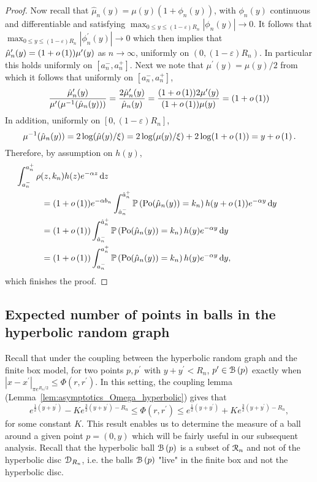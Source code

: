 \begin{proof}
Now recall that $\hat{\mu}_n(y) = \mu(y)(1 + \phi_n(y))$, with $\phi_n(y)$ continuous and differentiable and satisfying
$\max_{0 \le y \le (1 - \varepsilon)R_n} |\phi_n(y)| \to 0$. It follows that $\max_{0 \le y \le (1 - \varepsilon)R_n} |\phi_n^\prime(y)| \to 0$ which then implies that $\hat{\mu}_n^\prime(y) = (1 + o\left(1\right))\mu^\prime(y)$ as $n \to \infty$, uniformly on $(0,(1-\varepsilon)R_n)$. In particular this holds uniformly on $[a_n^-, a_n^+]$. Next we note that $\mu^\prime(y) = \mu(y)/2$ from which it follows that uniformly on $[a_n^-, a_n^+]$,
\[
	\frac{\hat{\mu}_n^\prime(y)}{\mu^\prime(\mu^{-1}(\hat{\mu}_n(y)))}
	= \frac{2\hat{\mu}_n^\prime(y)}{\hat{\mu}_n(y)}
	= \frac{(1 + o\left(1\right))2\mu^\prime(y)}{(1 + o\left(1\right))\mu(y)}
	= (1+o\left(1\right))
\]
In addition, uniformly on $[0,(1-\varepsilon)R_n]$,
\[
	\mu^{-1}(\hat{\mu}_n(y)) = 2 \log(\hat{\mu}(y)/\xi) = 2 \log(\mu(y)/\xi) + 2 \log(1 + o\left(1\right)) = y + o\left(1\right).
\]
Therefore, by assumption on $h(y)$,
\begin{align*}
	&\hspace{-30pt}\int_{a_n^-}^{a_n^+} \rho(z,k_n) h(z) e^{-\alpha z} \dd z \\
	&= (1 + \smallO{1})e^{-\alpha b_n}\int_{\hat{a}_n^-}^{\hat{a}_n^+} \Prob{\Po(\hat{\mu}_n(y)) = k_n} h(y + \smallO{1})  
		e^{-\alpha y} \dd y\\
	&= (1 + \smallO{1}) \int_{\hat{a}_n^-}^{\hat{a}_n^+} \Prob{\Po(\hat{\mu}_n(y)) = k_n} h(y)  
		e^{-\alpha y} \dd y \\
	&= (1 + \smallO{1}) \int_{a_n^-}^{a_n^+} \Prob{\Po(\hat{\mu}_n(y)) = k_n} h(y)  
			e^{-\alpha y} \dd y,
\end{align*}
which finishes the proof.
\end{proof}

\subsection{Expected number of points in balls in the hyperbolic random graph}\label{ssec:average_degree_HP_n}

Recall that under the coupling between the hyperbolic random graph and the finite box model, for two points $p, p^\prime$ with $y + y^\prime < R_n$, $p^\prime \in {\mathcal B}\left(p\right)$ exactly when $|x-x^\prime|_{\pi e^{R_n/2}} \le \Phi(r,r^\prime)$. In this setting, the coupling lemma (Lemma~\ref{lem:asymptotics_Omega_hyperbolic}) gives that  
\[
	e^{\frac{1}{2}(y+y^\prime)} - K e^{\frac{3}{2}(y+y^\prime) - R_n} \leq \Phi(r, r^\prime) 
		\leq  e^{\frac{1}{2}(y+y^\prime)} + K e^{\frac{3}{2}(y+y^\prime) - R_n},
\]
for some constant $K$. %
This result enables us to determine the measure of a ball around a given point $p=(0,y)$ which will be fairly useful in our subsequent analysis. Recall that the hyperbolic ball ${\mathcal B}\left(p\right)$ is a subset of ${\mathcal R}_n$ and not of the hyperbolic disc ${\mathcal D}_{R_n}$, i.e. the balls ${\mathcal B}\left(p\right)$ "live" in the finite box and not the hyperbolic disc.

